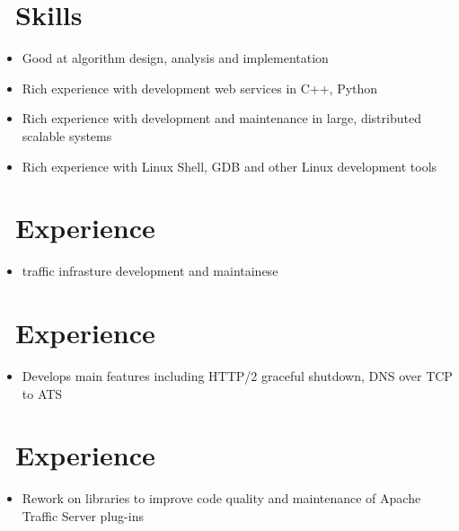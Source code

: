 \documentclass{resume}
\begin{document}



\section{\faCogs\ Skills}
\begin{itemize}[parsep=0.5ex]
        \item Good at algorithm design, analysis and implementation
        \item Rich experience with development web services in C++, Python
        \item Rich experience with development and maintenance in large, distributed scalable systems
        \item Rich experience with Linux Shell, GDB and other Linux development tools
\end{itemize}

\section{\faUsers\ Experience}
 {}{}
\begin{itemize}
    \item traffic infrasture development and maintainese
\end{itemize}

\section{\faUsers\ Experience}
 {}{}
\begin{itemize}
    \item Develops main features including HTTP/2 graceful shutdown, DNS over TCP to ATS
\end{itemize}

\section{\faUsers\ Experience}
 {}{}
\begin{itemize}
    \item Rework on libraries to improve code quality and maintenance of Apache Traffic Server plug-ins
\end{itemize}
\end{document}
